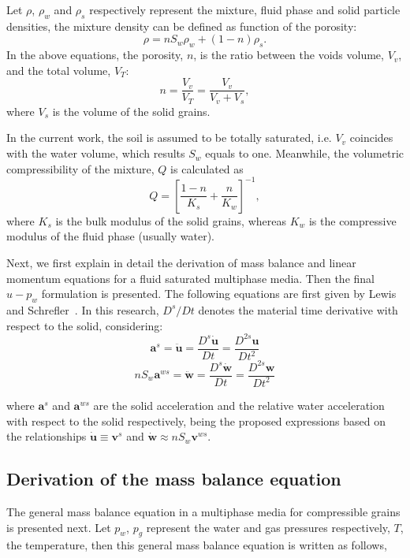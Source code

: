 \documentclass[twocolumn]{svjour3}          %
\begin{document}
Let $\rho$, $\rho_{w}$ and $\rho_{s}$ respectively represent the mixture, fluid phase and solid particle densities,   the mixture density can be  defined as function of the porosity:
\begin{equation}\label{eq_uw2}
\rho=n S_w \rho_{w}+(1-n) \rho_s.
\end{equation}
In the above equations, the porosity, $n$, is the ratio  between the voids volume, $V_v$, and the total volume, $V_T$:
\begin{equation}\label{eq_uw3}
n=\frac{V_v}{V_T}=\frac{V_v}{V_v+V_s},
\end{equation}
where $V_s$ is the volume of the solid grains.

In the current work, the soil is assumed to be totally saturated, i.e. $V_v$ coincides with the water volume, which results  $S_w$ equals to one. 
Meanwhile, the volumetric compressibility of the mixture, $Q$ \cite{Zienkiewicz99} is calculated as
\begin{equation}\label{eq_uw4}
Q = \left[ \frac{1-n}{K_s} + \frac{n}{K_w} \right]^{-1},
\end{equation}
where $K_s$ is the bulk modulus of  the solid grains, whereas  $K_w$ is  the compressive modulus of the fluid phase (usually water).

Next, we first  explain in detail the derivation of mass balance and linear momentum equations for a fluid saturated multiphase media. Then the final $u-p_w$ formulation is presented. The following equations are first given by Lewis and Schrefler~\cite{LewisSchrefler98}. In this research, $D^s/Dt$ denotes the material time derivative with respect to the solid, considering:
$$
\boldsymbol{a}^s =  \ddot{\boldsymbol{u}} = \frac{D^s \dot{\boldsymbol{u}}}{Dt} = \frac{D^{2s} \boldsymbol{u}}{Dt^2}
$$
$$
n S_w \boldsymbol{a}^{ws} =  \ddot{\boldsymbol{w}} = \frac{D^s \dot{\boldsymbol{w}}}{Dt} = \frac{D^{2s} \boldsymbol{w}}{Dt^2}
$$

where  $\boldsymbol{a}^s$ and $\boldsymbol{a}^{ws}$ are the solid acceleration and the relative water acceleration with respect to the solid respectively, being the proposed expressions based on the relationships $\boldsymbol{\dot{u}} \equiv \boldsymbol{v}^{s}$ and $\boldsymbol{\dot{w}} \approx nS_w \boldsymbol{v}^{ws}$.


\subsection{Derivation of the mass balance equation}\label{subsec:21}
The general mass balance equation in a multiphase media for compressible grains is presented next. 
Let $p_w$, $p_g$ represent the water and gas pressures respectively, $T$, the temperature, %
then this general mass balance equation is written as follows,
\end{document}
